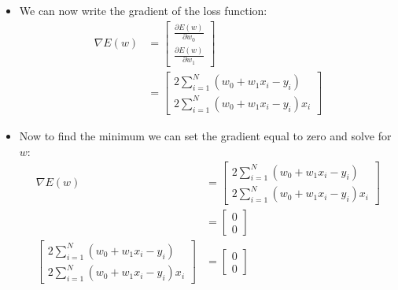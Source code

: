 \documentclass[12pt]{article}
\begin{document}
\begin{itemize}
\begin{itemize}
                        \item We can now write the gradient of the loss function:
                        \begin{align*}
                            \nabla E(w) &= \begin{bmatrix}
                                \frac{\partial E(w)}{\partial w_0}\\
                                \frac{\partial E(w)}{\partial w_1}
                            \end{bmatrix}\\
                            &= \begin{bmatrix}
                                2 \sum_{i=1}^N (w_0 + w_1x_i - y_i)\\
                                2 \sum_{i=1}^N (w_0 + w_1x_i - y_i)x_i
                            \end{bmatrix}
                        \end{align*}
                        \item Now to find the minimum we can set the gradient equal to zero and solve for $w$:
                        \begin{align*}
                            \nabla E(w) &= \begin{bmatrix}
                                2 \sum_{i=1}^N (w_0 + w_1x_i - y_i)\\
                                2 \sum_{i=1}^N (w_0 + w_1x_i - y_i)x_i
                            \end{bmatrix}\\
                            &= \begin{bmatrix}
                                0\\
                                0
                            \end{bmatrix}\\
                            \begin{bmatrix}
                                2 \sum_{i=1}^N (w_0 + w_1x_i - y_i)\\
                                2 \sum_{i=1}^N (w_0 + w_1x_i - y_i)x_i
                            \end{bmatrix} &= \begin{bmatrix}
                                0\\
                                0
                            \end{bmatrix}\\

\end{align*}
\end{itemize}
\end{itemize}
\end{document}
